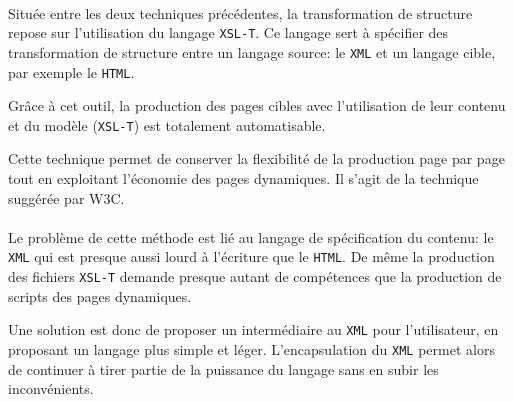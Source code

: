 \paragraph{}Située entre les deux techniques précédentes, la transformation de structure repose sur l'utilisation du langage \texttt{XSL-T}. Ce langage sert à spécifier des transformation de structure entre un langage source: le \texttt{XML} et un langage cible, par exemple le \texttt{HTML}. 

Grâce à cet outil, la production des pages cibles avec l'utilisation de leur contenu et du modèle (\texttt{XSL-T}) est totalement automatisable.

Cette technique permet de conserver la flexibilité de la production page par page tout en exploitant l'économie des pages dynamiques. Il s'agit de la technique suggérée par W3C.

\paragraph{}Le problème de cette méthode est lié au langage de spécification du contenu: le \texttt{XML} qui est presque aussi lourd à l'écriture que le \texttt{HTML}. De même la production des fichiers \texttt{XSL-T} demande presque autant de compétences que la production de scripts des pages dynamiques.

Une solution est donc de proposer un intermédiaire au \texttt{XML} pour l'utilisateur, en proposant un langage plus simple et léger. L'encapsulation du \texttt{XML} permet alors de continuer à tirer partie de la puissance du langage sans en subir les inconvénients. 
